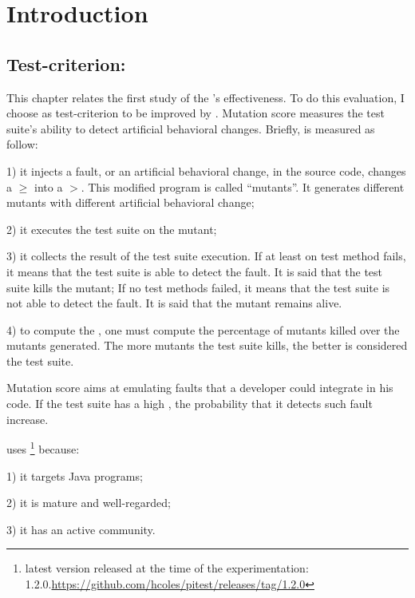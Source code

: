 \section{Introduction}
\label{sec:test-improvement:introduction}



\subsection{Test-criterion: \ms}
\label{subsec:test-improvement:introduction:test-criterion}

This chapter relates the first study of the \dspot's effectiveness.
To do this evaluation, I choose \ms as test-criterion to be improved by \dspot.
Mutation score measures the test suite's ability to detect artificial behavioral changes.
Briefly, \ms is measured as follow:

1) it injects a fault, or an artificial behavioral change, in the source code, \eg changes a $\ge$ into a $>$.
This modified program is called ``mutants''.
It generates different mutants with different artificial behavioral change;

2) it executes the test suite on the mutant;

3) it collects the result of the test suite execution.
If at least on test method fails, it means that the test suite is able to detect the fault.
It is said that the test suite kills the mutant;
If no test methods failed, it means that the test suite is not able to detect the fault. 
It is said that the mutant remains alive.

4) to compute the \ms, one must compute the percentage of mutants killed over the mutants generated.
The more mutants the test suite kills, the better is considered the test suite.

Mutation score aims at emulating faults that a developer could integrate in his code.
If the test suite has a high \ms, the probability that it detects such fault increase.

\dspot uses \pitest \footnote{latest version released at the time of the experimentation: 1.2.0.\url{https://github.com/hcoles/pitest/releases/tag/1.2.0}} because: 

1) it targets Java programs;

2) it is mature and well-regarded;

3) it has an active community.

